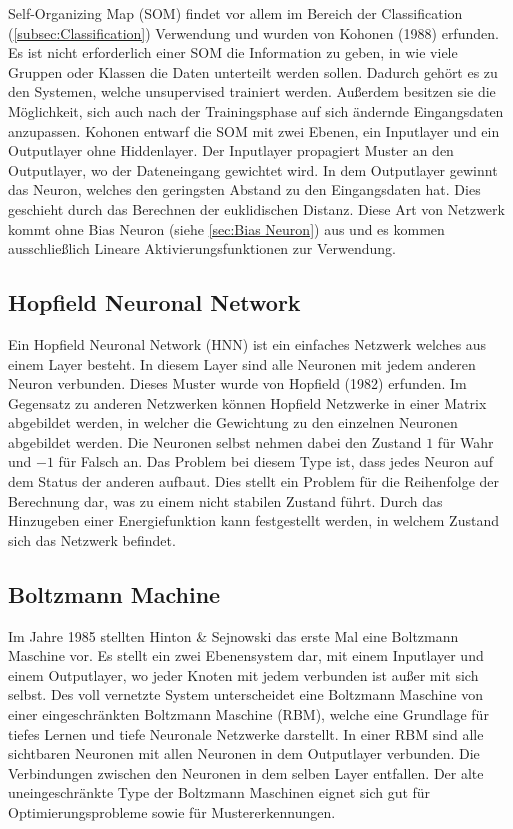 Self-Organizing Map (SOM) findet vor allem im Bereich der Classification (\ref{subsec:Classification}) Verwendung und wurden von Kohonen (1988) erfunden. 
Es ist nicht erforderlich einer SOM die Information zu geben, in wie viele Gruppen oder Klassen die Daten unterteilt werden sollen. 
Dadurch gehört es zu den Systemen, welche unsupervised trainiert werden. 
Außerdem besitzen sie die Möglichkeit, sich auch nach der Trainingsphase auf sich ändernde Eingangsdaten anzupassen. 
Kohonen entwarf die SOM mit zwei Ebenen, ein Inputlayer und ein Outputlayer ohne Hiddenlayer. 
Der Inputlayer propagiert Muster an den Outputlayer, wo der Dateneingang gewichtet wird. 
In dem Outputlayer gewinnt das Neuron, welches den geringsten Abstand zu den Eingangsdaten hat.
Dies geschieht durch das Berechnen der euklidischen Distanz. 
Diese Art von Netzwerk kommt ohne Bias Neuron (siehe \ref{sec:Bias Neuron}) aus und es kommen ausschließlich Lineare Aktivierungsfunktionen zur Verwendung.


\subsection{Hopfield Neuronal Network}

Ein Hopfield Neuronal Network (HNN) ist ein einfaches Netzwerk welches aus einem Layer besteht. 
In diesem Layer sind alle Neuronen mit jedem anderen Neuron verbunden. 
Dieses Muster wurde von Hopfield (1982) erfunden. 
Im Gegensatz zu anderen Netzwerken können Hopfield Netzwerke in einer Matrix abgebildet werden, in welcher die Gewichtung zu den einzelnen Neuronen abgebildet werden. 
Die Neuronen selbst nehmen dabei den Zustand $1$ für Wahr und $-1$ für Falsch an.
Das Problem bei diesem Type ist, dass jedes Neuron auf dem Status der anderen aufbaut.
Dies stellt ein Problem für die Reihenfolge der Berechnung dar, was zu einem nicht stabilen Zustand führt.
Durch das Hinzugeben einer Energiefunktion kann festgestellt werden, in welchem Zustand sich das Netzwerk befindet.

\subsection{Boltzmann Machine}

Im Jahre 1985 stellten Hinton \& Sejnowski das erste Mal eine Boltzmann Maschine vor.
Es stellt ein zwei Ebenensystem dar, mit einem Inputlayer und einem Outputlayer, wo jeder Knoten mit jedem verbunden ist außer mit sich selbst.
Des voll vernetzte System unterscheidet eine Boltzmann Maschine von einer eingeschränkten Boltzmann Maschine (RBM), welche eine Grundlage für tiefes Lernen und tiefe Neuronale Netzwerke darstellt.
In einer RBM sind alle sichtbaren Neuronen mit allen Neuronen in dem Outputlayer verbunden. 
Die Verbindungen zwischen den Neuronen in dem selben Layer entfallen.
Der alte uneingeschränkte Type der Boltzmann Maschinen eignet sich gut für Optimierungsprobleme sowie für Mustererkennungen.


